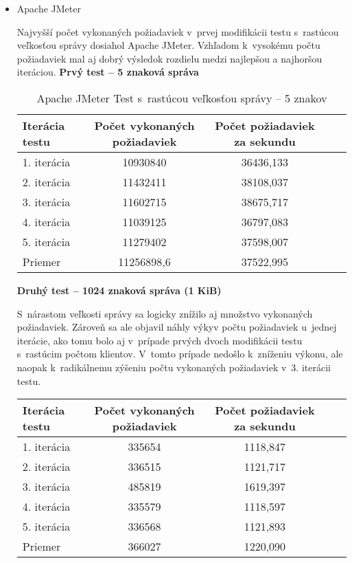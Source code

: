 \documentclass[12pt,oneside,final]{fithesis-utf8}
\begin{document}
\begin{itemize}

\item Apache JMeter

Najvyšší počet vykonaných požiadaviek v~prvej modifikácii testu s~rastúcou veľkosťou správy dosiahol Apache JMeter. Vzhľadom k~vysokému počtu požiadaviek mal aj dobrý výsledok rozdielu medzi najlepšou a najhoršou iteráciou.
\newpage
\textbf{Prvý test -- 5 znaková správa}

\begin{table}[H]
\begin{center}
\begin{tabular}{ | l | c | c | c | c |}
		\hline
		 \textbf{Iterácia testu} & \textbf{Počet vykonaných požiadaviek} & \textbf{Počet požiadaviek za sekundu} \\ \hline
		 1. iterácia & 10930840 & 36436,133 \\ \hline
		 2. iterácia & 11432411 & 38108,037 \\ \hline
		 3. iterácia & 11602715 & 38675,717 \\ \hline
		 4. iterácia & 11039125 & 36797,083 \\ \hline
		 5. iterácia & 11279402 & 37598,007 \\ \hline
		 Priemer & 11256898,6 & 37522,995 \\ \hline
		 
\end{tabular}
\end{center}
\caption{Apache JMeter Test s~rastúcou veľkosťou správy -- 5 znakov}
\end{table}


\textbf{Druhý test -- 1024 znaková správa (1 KiB)}

S~nárastom veľkosti správy sa logicky znížilo aj množstvo vykonaných požiadaviek. Zároveň sa ale objavil náhly výkyv počtu požiadaviek u~jednej iterácie, ako tomu bolo aj v~prípade prvých dvoch modifikácii testu s~rastúcim počtom klientov. V~tomto prípade nedošlo k~zníženiu výkonu, ale naopak k~radikálnemu zýšeniu počtu vykonaných požiadaviek v~3. iterácii testu.

\begin{table}[H]
\begin{center}
\begin{tabular}{ | l | c | c | c | c |}
		\hline
		 \textbf{Iterácia testu} & \textbf{Počet vykonaných požiadaviek} & \textbf{Počet požiadaviek za sekundu} \\ \hline
		 1. iterácia & 335654 & 1118,847 \\ \hline
		 2. iterácia & 336515 & 1121,717 \\ \hline
		 3. iterácia & 485819 & 1619,397 \\ \hline
		 4. iterácia & 335579 & 1118,597 \\ \hline
		 5. iterácia & 336568 & 1121,893 \\ \hline
		 Priemer & 366027 & 1220,090 \\ \hline
		 

\end{tabular}
\end{center}
\end{table}
\end{itemize}
\end{document}
